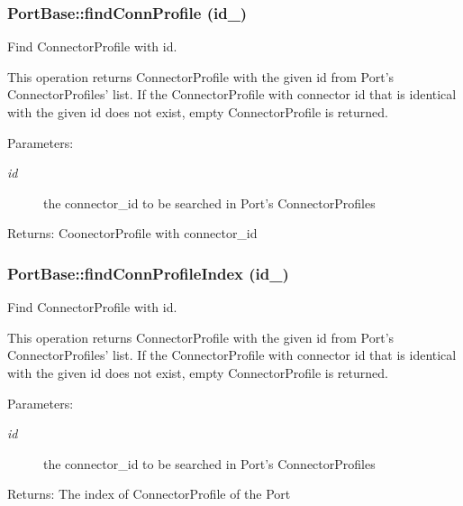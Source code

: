 \subsubsection{\setlength{\rightskip}{0pt plus 5cm}Port\-Base::find\-Conn\-Profile (id\_\-)}\label{classPortBase_PortBasea21}


Find Connector\-Profile with id. 

This operation returns Connector\-Profile with the given id from Port's Connector\-Profiles' list. If the Connector\-Profile with connector id that is identical with the given id does not exist, empty Connector\-Profile is returned.

\begin{Desc}
\item[Parameters:]
\begin{description}
\item[{\em id}]the connector\_\-id to be searched in Port's Connector\-Profiles \end{description}
\end{Desc}
\begin{Desc}
\item[Returns:]Coonector\-Profile with connector\_\-id\end{Desc}
\subsubsection{\setlength{\rightskip}{0pt plus 5cm}Port\-Base::find\-Conn\-Profile\-Index (id\_\-)}\label{classPortBase_PortBasea22}


Find Connector\-Profile with id. 

This operation returns Connector\-Profile with the given id from Port's Connector\-Profiles' list. If the Connector\-Profile with connector id that is identical with the given id does not exist, empty Connector\-Profile is returned.

\begin{Desc}
\item[Parameters:]
\begin{description}
\item[{\em id}]the connector\_\-id to be searched in Port's Connector\-Profiles \end{description}
\end{Desc}
\begin{Desc}
\item[Returns:]The index of Connector\-Profile of the Port\end{Desc}
